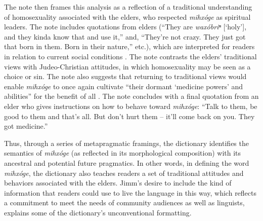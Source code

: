 \documentclass[output=paper]{LSP/langsci}
\begin{document}
The note then frames this analysis as a reflection of a traditional understanding of homosexuality associated with the elders, who respected \emph{mihxóge} as spiritual leaders. The note includes quotations from elders (``They are \emph{waxóbriⁿ} [`holy'], and they kinda know that and use it,'' and, ``They're not crazy. They just got that born in them. Born in their nature,'' etc.), which are interpreted for readers in relation to current social conditions \citep[7]{Goodtracks2008}. The note contrasts the elders' traditional views with Judeo-Christian attitudes, in which homosexuality may be seen as a choice or sin. The note also suggests that returning to traditional views would enable \emph{mihxóge} to once again cultivate ``their dormant `medicine powers' and abilities'' for the benefit of all \citep[7]{Goodtracks2008}. The note concludes with a final quotation from an elder who gives instructions on how to behave toward \emph{mihxóge}: ``Talk to them, be good to them and that's all. But don't hurt them -- it'll come back on you. They got medicine.'' \citep[7]{Goodtracks2008}

Thus, through a series of metapragmatic framings, the dictionary identifies the semantics of \emph{mihxóge} (as reflected in its morphological composition) with its ancestral and potential future pragmatics. In other words, in defining the word \emph{mihxóge}, the dictionary also teaches readers a set of traditional attitudes and behaviors associated with the elders. Jimm's desire to include the kind of information that readers could use to live the language in this way, which reflects a commitment to meet the needs of community audiences as well as linguists, explains some of the dictionary's unconventional formatting.
\end{document}

